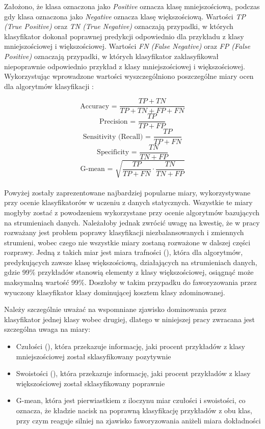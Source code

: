 \noindent Założono, że klasa oznaczona jako \textit{Positive} oznacza klasę mniejszościową, podczas gdy klasa oznaczona jako \textit{Negative} oznacza klasę większościową. Wartości \textit{TP (True Positive)} oraz \textit{TN (True Negative)} oznaczają przypadki, w których klasyfikator dokonał poprawnej predykcji odpowiednio dla przykładu z klasy mniejszościowej i większościowej. Wartości \textit{FN (False Negative)} oraz \textit{FP (False Positive)} oznaczają przypadki, w których klasyfikator zaklasyfikował niepoprawnie odpowiednio przykład z klasy mniejszościowej i większościowej. Wykorzystując wprowadzone wartości wyszczególniono poszczególne miary ocen dla algorytmów klasyfikacji \cite{Inbook:Metrics}:

$$\textrm{Accuracy = }\frac{TP + TN}{TP + TN + FP + FN}$$
$$\textrm{Precision = }\frac{TP}{TP + FP}$$
$$\textrm{Sensitivity (Recall) = }\frac{TP}{TP + FN}$$
$$\textrm{Specificity = }\frac{TN}{TN + FP}$$
$$\textrm{G-mean = }\sqrt{\frac{TP}{TP + FN} \cdot \frac{TN}{TN + FP}}$$\\

\noindent Powyżej zostały zaprezentowane najbardziej popularne miary, wykorzystywane przy ocenie klasyfikatorów w uczeniu z danych statycznych. Wszystkie te miary mogłyby zostać z powodzeniem wykorzystane przy ocenie algorytmów bazujących na strumieniach danych. Należałoby jednak zwrócić uwagę na kwestię, że w pracy rozważany jest problem poprawy klasyfikacji niezbalansowanych i zmiennych strumieni, wobec czego nie wszystkie miary zostaną rozważone w dalszej części rozprawy. Jedną z takich miar jest miara trafności (), która dla algorytmów, predykujących zawsze klasę większościową, działających na strumieniach danych, gdzie 99\% przykładów stanowią elementy z klasy większościowej, osiągnąć może maksymalną wartość 99\%. Doszłoby w takim przypadku do faworyzowania przez wyuczony klasyfikator klasy dominującej kosztem klasy zdominowanej.

Należy szczególnie uważać na wspomniane zjawisko dominowania przez klasyfikator jednej klasy wobec drugiej, dlatego w niniejszej pracy zwracana jest szczególna uwaga na miary:

\begin{itemize}
    \item Czułości (), która przekazuje informację, jaki procent przykładów z klasy mniejszościowej został sklasyfikowany pozytywnie
    \item Swoistości (), która przekazuje informację, jaki procent przykładów z klasy większościowej został sklasyfikowany poprawnie
    \item G-mean, która jest pierwiastkiem z iloczynu miar czułości i swoistości, co oznacza, że kładzie nacisk na poprawną klasyfikację przykładów z obu klas, przy czym reaguje silniej na zjawisko faworyzowania aniżeli miara dokładności
\end{itemize}

